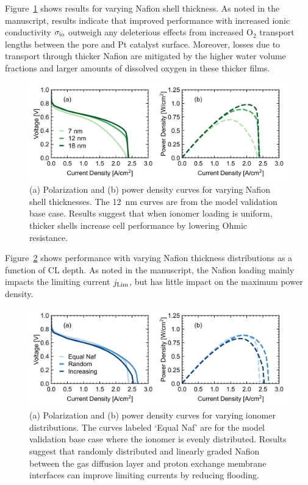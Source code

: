 \documentclass[final,3p,times,onecolumn]{elsarticle}    %
\newcommand{\crr}[1]{\color{red} #1 \color{black}} %
\begin{document}
Figure~\ref{fig:naf-thickness-study} shows results for varying Nafion shell thickness. As noted in the manuscript, results indicate that improved performance with increased ionic conductivity $\sigma_{\rm io}$ outweigh any deleterious effects from increased O$_2$ transport lengths between the pore and Pt catalyst surface. Moreover, losses due to transport through thicker Nafion are mitigated by the higher water volume fractions and larger amounts of dissolved oxygen in these thicker films.
\begin{figure}[H]
    \centering
    \includegraphics[width=5.718in]{figures_uniform/naf-thickness-5_718in.png}
    \crr{
    \caption{(a) Polarization and (b) power density curves for varying Nafion shell thicknesses. The 12~nm curves are from the model validation base case. Results suggest that when ionomer loading is uniform, thicker shells increase cell performance by lowering Ohmic resistance.}}
    \label{fig:naf-thickness-study}
\end{figure}

Figure~\ref{fig:naf-distribution-study} shows performance with varying Nafion thickness distributions as a function of CL depth. As noted in the manuscript, the Nafion loading mainly impacts the limiting current $j_{\rm Lim}$, but has little impact on the maximum power density.
\begin{figure}[H]
    \centering
    \includegraphics[width=5.718in]{figures_uniform/naf-distribution-5_718in.png}
    \crr{
    \caption{(a) Polarization and (b) power density curves for varying ionomer distributions. The curves labeled `Equal Naf' are for the model validation base case where the ionomer is evenly distributed. Results suggest that randomly distributed and linearly graded Nafion between the gas diffusion layer and proton exchange membrane interfaces can improve limiting currents by reducing flooding.}}
    \label{fig:naf-distribution-study}
\end{figure}
\end{document}
